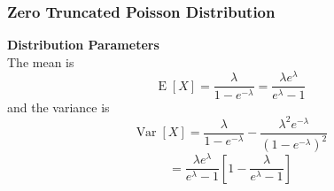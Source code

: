 \documentclass[MASTER.tex]{subfiles}
\begin{document}
\begin{frame}
	\frametitle{Zero Truncated Poisson Distribution}
	\Large
\textbf{Distribution Parameters}\\
The mean is
\[ \operatorname{E}[X]=\frac{\lambda}{1-e^{-\lambda}}=\frac{\lambda e^\lambda}{e^\lambda-1} \]
and the variance is
\[ \operatorname{Var}[X]=\frac{\lambda}{1-e^{-\lambda}} - \frac{\lambda^2 e^{-\lambda}}{(1-e^{-\lambda})^2}\] 
\[ = \frac{\lambda e^\lambda}{e^\lambda-1}\left[1-\frac{\lambda}{e^\lambda-1}\right] \]

\end{frame}
\end{document}
